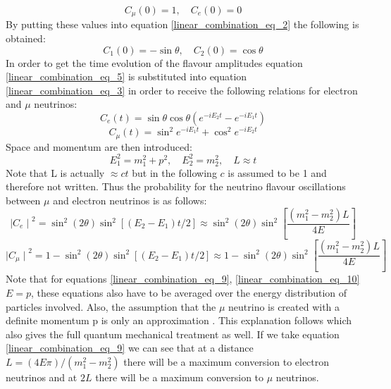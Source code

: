 \begin{equation}
    C_\mu(0) = 1, \quad C_e(0) = 0
    \label{linear_combination_eq_4}
\end{equation}
By putting these values into equation \ref{linear_combination_eq_2} the following is obtained:
\begin{equation}
    C_1(0) = -\sin\theta, \quad C_2(0) = \cos\theta
    \label{linear_combination_eq_5}
\end{equation}
In order to get the time evolution of the flavour amplitudes equation \ref{linear_combination_eq_5} is substituted into equation \ref{linear_combination_eq_3} in order to receive the following relations for electron and $\mu$ neutrinos: 
\begin{equation}
    C_e(t)=\sin\theta\cos\theta(e^{-iE_2t}-e^{-iE_1t})
    \label{linear_combination_eq_6}
\end{equation}
\begin{equation}
    C_\mu(t)=\sin^{2}e^{-iE_1t} + \cos^{2}e^{-iE_2t}
    \label{linear_combination_eq_7}
\end{equation}
Space and momentum are then introduced: 
\begin{equation}
   E_1^2=m_1^2 + p^2, \quad E_2^2=m_2^2  , \quad L \approx t
    \label{linear_combination_eq_8}
\end{equation}
Note that L is actually $\approx ct$ but in the following $c$ is assumed to be 1 and therefore not written. Thus the probability for the neutrino flavour oscillations between $\mu$ and electron neutrinos is as follows: 
\begin{equation}
   {\mid{C_e}\mid}^2 = \sin^2(2\theta)\sin^2[(E_2-E_1)t/2] \approx \sin^2(2\theta)\sin^2\left[\frac{(m_1^2-m_2^2)L}{4E}\right]
    \label{linear_combination_eq_9}
\end{equation}
\begin{equation}
    {\mid{C_\mu}\mid}^2 = 1 - \sin^2(2\theta)\sin^2[(E_2-E_1)t/2] \approx 1 - \sin^2(2\theta)\sin^2\left[\frac{(m_1^2-m_2^2)L}{4E}\right]
    \label{linear_combination_eq_10}
\end{equation}
Note that for equations \ref{linear_combination_eq_9}, \ref{linear_combination_eq_10} $E = p$, these equations also have to be averaged over the energy distribution of particles involved. Also, the assumption that the $\mu$ neutrino is created with a definite momentum p is only an approximation \cite{sassaroli1999neutrino}. This explanation follows \cite{sassaroli1999neutrino} which also gives the full quantum mechanical treatment as well. If we take equation \ref{linear_combination_eq_9} we can see that at a distance $L = (4E\pi) / (m_1^2 - m_2^2)$ there will be a maximum conversion to electron neutrinos and at $2L$ there will be a maximum conversion to $\mu$ neutrinos. 

